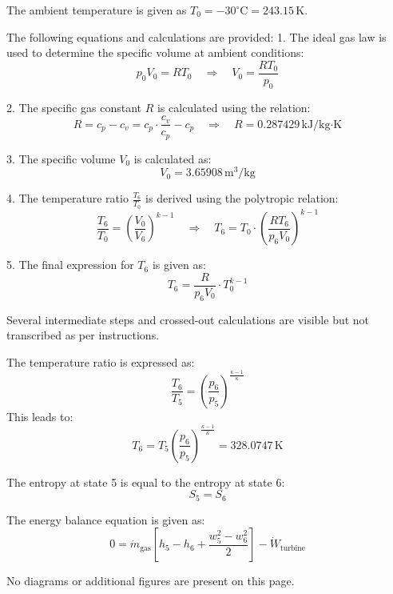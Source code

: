 The ambient temperature is given as \( T_0 = -30^\circ\text{C} = 243.15 \, \text{K} \).  

The following equations and calculations are provided:  
1. The ideal gas law is used to determine the specific volume at ambient conditions:  
   \[
   p_0 V_0 = R T_0 \quad \Rightarrow \quad V_0 = \frac{R T_0}{p_0}
   \]  

2. The specific gas constant \( R \) is calculated using the relation:  
   \[
   R = c_p - c_v = c_p \cdot \frac{c_v}{c_p} - c_p \quad \Rightarrow \quad R = 0.287429 \, \text{kJ/kg·K}
   \]  

3. The specific volume \( V_0 \) is calculated as:  
   \[
   V_0 = 3.65908 \, \text{m}^3/\text{kg}
   \]  

4. The temperature ratio \( \frac{T_6}{T_0} \) is derived using the polytropic relation:  
   \[
   \frac{T_6}{T_0} = \left( \frac{V_0}{V_6} \right)^{k-1} \quad \Rightarrow \quad T_6 = T_0 \cdot \left( \frac{R T_6}{p_6 V_0} \right)^{k-1}
   \]  

5. The final expression for \( T_6 \) is given as:  
   \[
   T_6 = \frac{R}{p_6 V_0} \cdot T_0^{k-1}
   \]  

Several intermediate steps and crossed-out calculations are visible but not transcribed as per instructions.

The temperature ratio is expressed as:  
\[
\frac{T_6}{T_5} = \left( \frac{p_6}{p_5} \right)^{\frac{\kappa-1}{\kappa}}
\]  
This leads to:  
\[
T_6 = T_5 \left( \frac{p_6}{p_5} \right)^{\frac{\kappa-1}{\kappa}} = 328.0747 \, \text{K}
\]  

The entropy at state 5 is equal to the entropy at state 6:  
\[
S_5 = S_6
\]  

The energy balance equation is given as:  
\[
0 = \dot{m}_{\text{gas}} \left[ h_5 - h_6 + \frac{w_5^2 - w_6^2}{2} \right] - \dot{W}_{\text{turbine}}
\]  

No diagrams or additional figures are present on this page.
